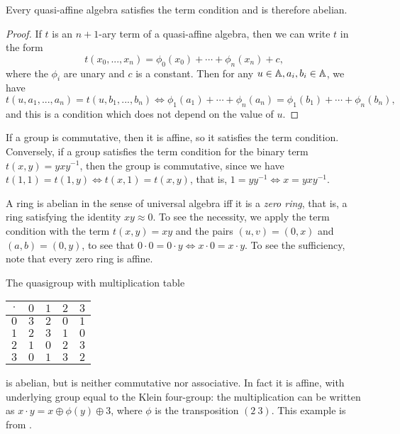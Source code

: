 \documentclass[letterpaper,11pt]{article}
\begin{document}
\begin{prop} Every quasi-affine algebra satisfies the term condition and is therefore abelian.
\end{prop}
\begin{proof} If $t$ is an $n+1$-ary term of a quasi-affine algebra, then we can write $t$ in the form
\[
t(x_0, ..., x_n) = \phi_0(x_0) + \cdots + \phi_n(x_n) + c,
\]
where the $\phi_i$ are unary and $c$ is a constant. Then for any $u \in \mathbb{A}, a_i, b_i \in \mathbb{A}$, we have
\[
t(u,a_1, ..., a_n) = t(u,b_1,...,b_n) \iff \phi_1(a_1) + \cdots + \phi_n(a_n) = \phi_1(b_1) + \cdots + \phi_n(b_n),
\]
and this is a condition which does not depend on the value of $u$.
\end{proof}

\begin{ex} If a group is commutative, then it is affine, so it satisfies the term condition. Conversely, if a group satisfies the term condition for the binary term $t(x,y) = yxy^{-1}$, then the group is commutative, since we have $t(1,1) = t(1,y) \iff t(x,1) = t(x,y)$, that is, $1 = yy^{-1} \iff x = yxy^{-1}$.
\end{ex}

\begin{ex} A ring is abelian in the sense of universal algebra iff it is a \emph{zero ring}, that is, a ring satisfying the identity $xy \approx 0$. To see the necessity, we apply the term condition with the term $t(x,y) = xy$ and the pairs $(u,v) = (0,x)$ and $(a,b) = (0,y)$, to see that $0\cdot 0 = 0 \cdot y \iff x\cdot 0 = x\cdot y$. To see the sufficiency, note that every zero ring is affine.
\end{ex}

\begin{ex} The quasigroup with multiplication table
\begin{center}
\begin{tabular}{c|cccc} $\cdot$ & $0$ & $1$ & $2$ & $3$\\ \hline $0$ & $3$ & $2$ & $0$ & $1$\\ $1$ & $2$ & $3$ & $1$ & $0$\\ $2$ & $1$ & $0$ & $2$ & $3$\\ $3$ & $0$ & $1$ & $3$ & $2$\end{tabular}
\end{center}
is abelian, but is neither commutative nor associative. In fact it is affine, with underlying group equal to the Klein four-group: the multiplication can be written as $x\cdot y = x \oplus \phi(y) \oplus 3$, where $\phi$ is the transposition $(2\ 3)$. This example is from \cite{commutator-theory}.
\end{ex}
\end{document}
